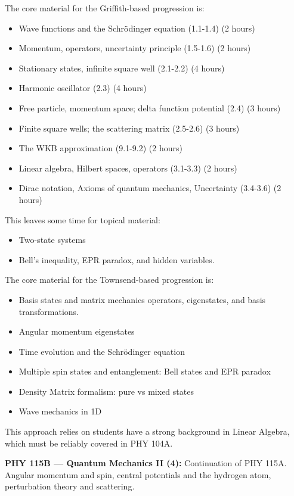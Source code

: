 \documentclass[12pt]{article}
\begin{document}
The core material for the Griffith-based progression is: 
\begin{itemize}
\item Wave functions and the Schr\"odinger equation (1.1-1.4) (2 hours)
\item Momentum, operators, uncertainty principle (1.5-1.6) (2 hours)
\item Stationary states, infinite square well (2.1-2.2) (4 hours)
\item Harmonic oscillator (2.3) (4 hours)
\item Free particle, momentum space; delta function potential (2.4) (3 hours)
\item Finite square wells; the scattering matrix (2.5-2.6) (3 hours)
\item The WKB approximation (9.1-9.2) (2 hours)
\item Linear algebra, Hilbert spaces, operators (3.1-3.3) (2 hours)
\item Dirac notation, Axioms of quantum mechanics, Uncertainty  (3.4-3.6) (2 hours)
\end{itemize}
This leaves some time for topical material:
\begin{itemize}
\item Two-state systems
\item Bell's inequality, EPR paradox, and hidden variables.
\end{itemize}

The core material for the Townsend-based progression is: 
\begin{itemize}
\item Basis states and matrix mechanics operators, eigenstates, and
  basis transformations.
\item Angular momentum eigenstates
\item Time evolution and the Schr\"odinger equation
\item Multiple spin states and entanglement: Bell states and EPR paradox
\item Density Matrix formalism: pure vs mixed states
\item Wave mechanics in 1D
\end{itemize}
This approach relies on students have a strong background in Linear Algebra, which must be reliably covered in PHY 104A.

\vskip 1cm
\noindent
{\bf PHY 115B --- Quantum Mechanics II (4):}
Continuation of PHY 115A.  Angular momentum and spin, central potentials and the hydrogen atom, perturbation theory and scattering.
\end{document}
